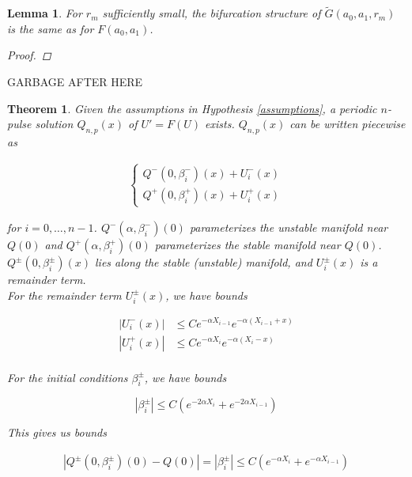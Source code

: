 \documentclass[12pt]{article}
\newtheorem{lemma}{Lemma}
\newtheorem{theorem}{Theorem}
\begin{document}
% 

\begin{lemma}
For $r_m$ sufficiently small, the bifurcation structure of $\tilde{G}(a_0, a_1, r_m)$ is the same as for $F(a_0, a_1)$.

\begin{proof}


\end{proof}
\end{lemma}




GARBAGE AFTER HERE \\

\begin{theorem}\label{2pconstruction}
Given the assumptions in Hypothesis \ref{assumptions}, a periodic $n$-pulse solution $Q_{n,p}(x)$ of $U' = F(U)$ exists. $Q_{n, p}(x)$ can be written piecewise as

\begin{align*}
\begin{cases}
Q^-(0, \beta_i^-)(x) + U_i^-(x) \\
Q^+(0, \beta_i^+)(x) + U_i^+(x)
\end{cases}
\end{align*}

for $i = 0, \dots, n-1$. $Q^-(\alpha, \beta_i^-)(0)$ parameterizes the unstable manifold near $Q(0)$ and $Q^+(\alpha, \beta_i^+)(0)$ parameterizes the stable manifold near $Q(0)$. $Q^\pm(0, \beta_i^\pm)(x)$ lies along the stable (unstable) manifold, and $U_i^\pm(x)$ is a remainder term.\\

For the remainder term $U_i^\pm(x)$, we have bounds

\begin{align*}
|U_i^-(x)| &\leq C e^{-\alpha X_{i-1}} e^{-\alpha(X_{i-1} + x)} \\
|U_i^+(x)| &\leq C e^{-\alpha X_i} e^{-\alpha(X_i - x)} \\
\end{align*}

For the initial conditions $\beta_i^\pm$, we have bounds

\begin{equation}
| \beta_i^\pm | \leq C (e^{-2 \alpha X_i} + e^{-2 \alpha X_{i-1}})
\end{equation}

This gives us bounds

\begin{align*}
|Q^\pm(0, \beta_i^\pm)(0) - Q(0)| = |\beta_i^\pm| \leq 
C \left( e^{-\alpha X_i} + e^{-\alpha X_{i-1}} \right)
\end{align*}

\end{theorem}
\end{document}
